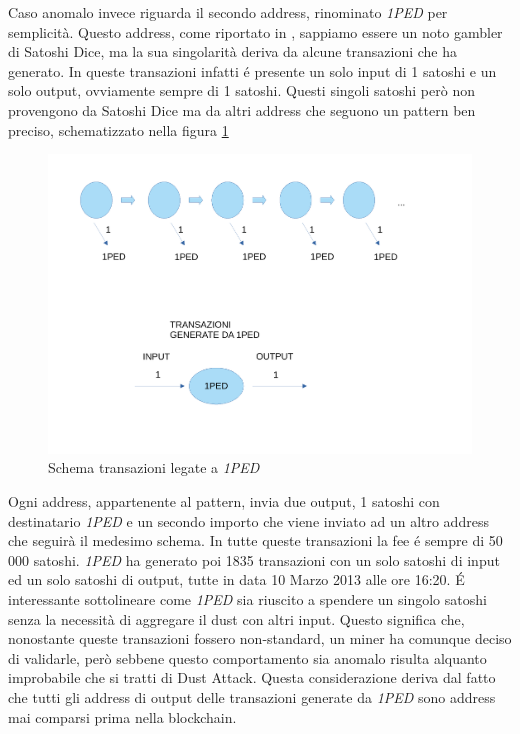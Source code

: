 Caso anomalo invece riguarda il secondo address, rinominato \textit{1PED} per semplicità. Questo address, come riportato in \cite{dustAnalisi}, sappiamo essere un noto gambler di Satoshi Dice, ma la sua singolarità deriva da alcune transazioni che ha generato. In queste transazioni infatti é presente un solo input di 1 satoshi e un solo output, ovviamente sempre di 1 satoshi. Questi singoli satoshi però non provengono da Satoshi Dice ma da altri address che seguono un pattern ben preciso, schematizzato nella figura \ref{fig:1PED}
\begin{figure}[h!]
    \centering
    \includegraphics[scale=0.4]{Images/1Ped.pdf}
    \caption{Schema transazioni legate a \textit{1PED}}
    \label{fig:1PED}
\end{figure}
\FloatBarrier
Ogni address, appartenente al pattern, invia due output, 1 satoshi con destinatario \textit{1PED} e un secondo importo che viene inviato ad un altro address che seguirà il medesimo schema. In tutte queste transazioni la fee é sempre di 50 000 satoshi. \textit{1PED} ha generato poi 1835 transazioni con un solo satoshi di input ed un solo satoshi di output, tutte in data 10 Marzo 2013 alle ore 16:20. É interessante sottolineare come \textit{1PED} sia riuscito a spendere un singolo satoshi senza la necessità di aggregare il dust con altri input. Questo significa che, nonostante queste transazioni fossero non-standard, un miner ha comunque deciso di validarle, però sebbene questo comportamento sia anomalo risulta alquanto improbabile che si tratti di Dust Attack. Questa considerazione deriva dal fatto che tutti gli address di output delle transazioni generate da \textit{1PED} sono address mai comparsi prima nella blockchain.

